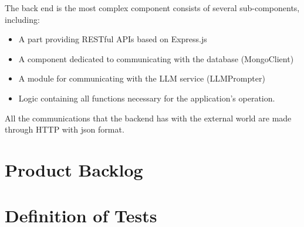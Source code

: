\documentclass{article}
\begin{document}
The back end is the most complex component consists of several sub-components, including:
\begin{itemize}
  \item A part providing RESTful APIs based on Express.js
  \item A component dedicated to communicating with the database (MongoClient)
  \item A module for communicating with the LLM service (LLMPrompter)
  \item Logic containing all functions necessary for the application's operation.
\end{itemize}
All the communications that the backend has with the external world are made through HTTP with json format.

\section{Product Backlog}




\section{Definition of Tests}
\end{document}
